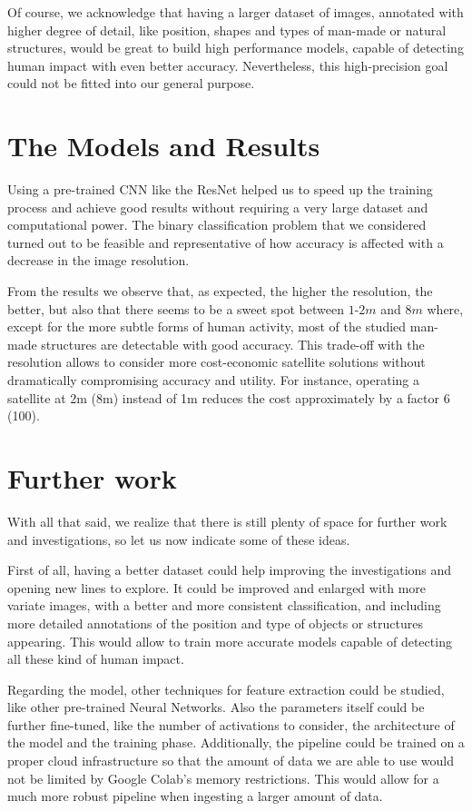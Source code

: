 Of course, we acknowledge that having a larger dataset of images, annotated with higher degree of detail, like position, shapes and types of man-made or natural structures, would be great to build high performance models, capable of detecting human impact with even better accuracy. Nevertheless, this high-precision goal could not be fitted into our general purpose.

\section{The Models and Results}

Using a pre-trained CNN like the ResNet helped us to speed up the training process and achieve good results without requiring a very large dataset and computational power. The binary classification problem that we considered turned out to be feasible and representative of how accuracy is affected with a decrease in the image resolution. 

From the results we observe that, as expected, the higher the resolution, the better, but also that there seems to be a sweet spot between $1$-$2m$ and $8m$ where, except for the more subtle forms of human activity, most of the studied man-made structures are detectable with good accuracy. This trade-off with the resolution allows to consider more cost-economic satellite solutions without dramatically compromising accuracy and utility. For instance, operating a satellite at 2m (8m) instead of 1m reduces the cost approximately by a factor 6 (100).

\section{Further work}

With all that said, we realize that there is still plenty of space for further work and investigations, so let us now indicate some of these ideas.

First of all, having a better dataset could help improving the investigations and opening new lines to explore. It could be improved and enlarged with more variate images, with a better and more consistent classification, and including more detailed annotations of the position and type of objects or structures appearing. This would allow to train more accurate models capable of detecting all these kind of human impact.

Regarding the model, other techniques for feature extraction could be studied, like other pre-trained Neural Networks. Also the parameters itself could be further fine-tuned, like the number of activations to consider, the architecture of the model and the training phase. Additionally, the pipeline could be trained on a proper cloud infrastructure so that the amount of data we are able to use would not be limited by Google Colab's memory restrictions. This would allow for a much more robust pipeline when ingesting a larger amount of data.

